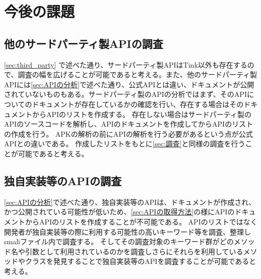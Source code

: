 \newpage
\section{今後の課題}
\subsection{他のサードパーティ製APIの調査}
\ref{sec:third_party}	で述べた通り、サードパーティ製APIはTink以外も存在するので、調査の幅を広げることが可能であると考える。また、他のサードパーティ製APIには\ref{sec:APIの分析}で述べた通り、公式APIとは違い、ドキュメントが公開されていないものもある。サードパーティ製のAPIの分析ではまず、そのAPIについてのドキュメントが存在しているかの確認を行い、存在する場合はそのドキュメントからAPIのリストを作成する。
存在しない場合はサードパーティ製のAPIのソースコードを解析し、APIのドキュメントを作成してからAPIのリストの作成を行う。
APKの解析の前にAPIの解析を行う必要があるという点が公式APIとの違いである。
作成したリストをもとに\ref{sec:調査}と同様の調査を行うことが可能であると考える。
\subsection{独自実装等のAPIの調査}
\ref{sec:APIの分析}で述べた通り、独自実装等のAPIは、ドキュメントが作成され、かつ公開されている可能性が低いため、\ref{sec:APIの取得方法}の様にAPIのドキュメントからAPIのリストを作成することが不可能である。
APIのリストではなく開発者が独自実装等の際に利用する可能性の高いキーワード等を調査、整理しsmaliファイル内で調査する。
そしてその調査対象のキーワード群がどのメソッド名や引数として利用されているのかを調査しさらにそれらを利用しているメソッドやクラスを発見することで独自実装等のAPIを調査することが可能であると考える。